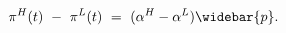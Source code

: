 \begin{equation}
\begin{split}
    \pi^{H} (t) \ - \ \pi^{L} (t) \
    & = \ (\alpha^{H} - \alpha^{L}) \widebar{p}.
\end{split}
\label{Equation:AKS-Style-Model_Difference-between-pis}
\end{equation}
